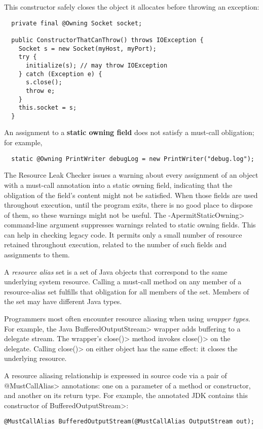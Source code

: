 This constructor safely closes the object it allocates before throwing an exception:
\begin{verbatim}
  private final @Owning Socket socket;

  public ConstructorThatCanThrow() throws IOException {
    Socket s = new Socket(myHost, myPort);
    try {
      initialize(s); // may throw IOException
    } catch (Exception e) {
      s.close();
      throw e;
    }
    this.socket = s;
  }
\end{verbatim}

An assignment to a \textbf{static owning field} does not satisfy a
must-call obligation; for example,

\begin{smaller}
\begin{Verbatim}
  static @Owning PrintWriter debugLog = new PrintWriter("debug.log");
\end{Verbatim}
\end{smaller}

\noindent
The Resource Leak Checker issues a warning about every assignment of an
object with a must-call annotation into a static owning field,
indicating that the obligation of the field's content might not be
satisfied.  When those fields are used throughout execution, until the
program exits, there is no good place to dispose of them, so these warnings
might not be useful.  The \<-ApermitStaticOwning> command-line argument
suppresses warnings related to static owning fields.  This can help in
checking legacy code.  It permits only a small number of resource retained
throughout execution, related to the number of such fields and assignments
to them.



A \emph{resource alias} set is a set of Java objects that
correspond to the same underlying system resource.
Calling a must-call method on any member of a resource-alias set
fulfills that obligation for all members of the set.
Members of the set may have different Java types.

Programmers most often encounter resource aliasing when using \emph{wrapper types}.
For example, the Java \<Buffered\-Output\-Stream> wrapper adds buffering to a
delegate stream.
The wrapper's \<close()> method invokes \<close()> on the delegate.  Calling
\<close()> on either object has the same effect:  it closes the underlying resource.

A resource aliasing relationship is expressed in source code via a pair of \<@MustCallAlias> annotations:
one on a parameter of a method or constructor, and another on its return type.
For example, the annotated JDK contains this constructor of \<BufferedOutputStream>:
\begin{Verbatim}
@MustCallAlias BufferedOutputStream(@MustCallAlias OutputStream out);
\end{Verbatim}

